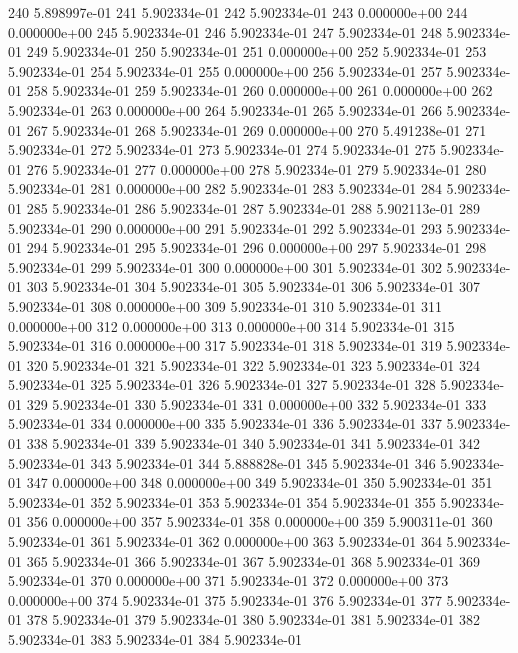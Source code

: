 \documentclass{article}
\begin{document}
\begin{Schunk}
\begin{Soutput}
240  5.898997e-01
241  5.902334e-01
242  5.902334e-01
243  0.000000e+00
244  0.000000e+00
245  5.902334e-01
246  5.902334e-01
247  5.902334e-01
248  5.902334e-01
249  5.902334e-01
250  5.902334e-01
251  0.000000e+00
252  5.902334e-01
253  5.902334e-01
254  5.902334e-01
255  0.000000e+00
256  5.902334e-01
257  5.902334e-01
258  5.902334e-01
259  5.902334e-01
260  0.000000e+00
261  0.000000e+00
262  5.902334e-01
263  0.000000e+00
264  5.902334e-01
265  5.902334e-01
266  5.902334e-01
267  5.902334e-01
268  5.902334e-01
269  0.000000e+00
270  5.491238e-01
271  5.902334e-01
272  5.902334e-01
273  5.902334e-01
274  5.902334e-01
275  5.902334e-01
276  5.902334e-01
277  0.000000e+00
278  5.902334e-01
279  5.902334e-01
280  5.902334e-01
281  0.000000e+00
282  5.902334e-01
283  5.902334e-01
284  5.902334e-01
285  5.902334e-01
286  5.902334e-01
287  5.902334e-01
288  5.902113e-01
289  5.902334e-01
290  0.000000e+00
291  5.902334e-01
292  5.902334e-01
293  5.902334e-01
294  5.902334e-01
295  5.902334e-01
296  0.000000e+00
297  5.902334e-01
298  5.902334e-01
299  5.902334e-01
300  0.000000e+00
301  5.902334e-01
302  5.902334e-01
303  5.902334e-01
304  5.902334e-01
305  5.902334e-01
306  5.902334e-01
307  5.902334e-01
308  0.000000e+00
309  5.902334e-01
310  5.902334e-01
311  0.000000e+00
312  0.000000e+00
313  0.000000e+00
314  5.902334e-01
315  5.902334e-01
316  0.000000e+00
317  5.902334e-01
318  5.902334e-01
319  5.902334e-01
320  5.902334e-01
321  5.902334e-01
322  5.902334e-01
323  5.902334e-01
324  5.902334e-01
325  5.902334e-01
326  5.902334e-01
327  5.902334e-01
328  5.902334e-01
329  5.902334e-01
330  5.902334e-01
331  0.000000e+00
332  5.902334e-01
333  5.902334e-01
334  0.000000e+00
335  5.902334e-01
336  5.902334e-01
337  5.902334e-01
338  5.902334e-01
339  5.902334e-01
340  5.902334e-01
341  5.902334e-01
342  5.902334e-01
343  5.902334e-01
344  5.888828e-01
345  5.902334e-01
346  5.902334e-01
347  0.000000e+00
348  0.000000e+00
349  5.902334e-01
350  5.902334e-01
351  5.902334e-01
352  5.902334e-01
353  5.902334e-01
354  5.902334e-01
355  5.902334e-01
356  0.000000e+00
357  5.902334e-01
358  0.000000e+00
359  5.900311e-01
360  5.902334e-01
361  5.902334e-01
362  0.000000e+00
363  5.902334e-01
364  5.902334e-01
365  5.902334e-01
366  5.902334e-01
367  5.902334e-01
368  5.902334e-01
369  5.902334e-01
370  0.000000e+00
371  5.902334e-01
372  0.000000e+00
373  0.000000e+00
374  5.902334e-01
375  5.902334e-01
376  5.902334e-01
377  5.902334e-01
378  5.902334e-01
379  5.902334e-01
380  5.902334e-01
381  5.902334e-01
382  5.902334e-01
383  5.902334e-01
384  5.902334e-01

\end{Soutput}
\end{Schunk}
\end{document}
